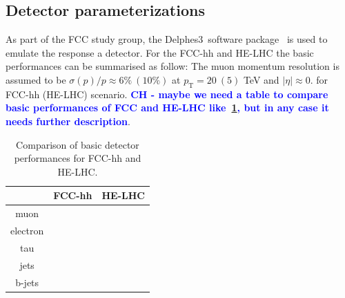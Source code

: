 \documentclass[a4paper,11pt]{article}
\newcommand{\CH}[1] {\textbf{\textcolor{blue}{CH - #1}}}
\newcommand{\pt}{\ensuremath{p_{\text{T}}}}
\newcommand{\delphes}{{\sc Delphes3}}
\begin{document}
\subsection{Detector parameterizations}
\label{subsec:detparam}

As part of the FCC study group, the \delphes\ software package~\cite{deFavereau:2013fsa} is used to emulate the response a detector.
For the FCC-hh and HE-LHC the basic performances can be summarised as follow: The muon momentum resolution is assumed to be $\sigma(p)/p \approx 6\%~(10\%)$ at $\pt= 20~(5)$ TeV and $|\eta| \approx 0.$ for FCC-hh (HE-LHC) scenario.
\CH{maybe we need a table to compare basic performances of FCC and HE-LHC like~\ref{tab:delphes_comp}, but in any case it needs further description}.

\begin{table}[!htb]\centering
\begin{tabular}{|c|c|c|}
\hline
 & FCC-hh & HE-LHC \\
\hline
 muon & & \\
\hline
 electron  & & \\
\hline
 tau  & & \\
\hline
 jets & & \\
\hline
  b-jets  & & \\
\hline
\end{tabular}
\caption{Comparison of basic detector performances for FCC-hh and HE-LHC.}
\label{tab:delphes_comp}
\end{table}



\end{document}
